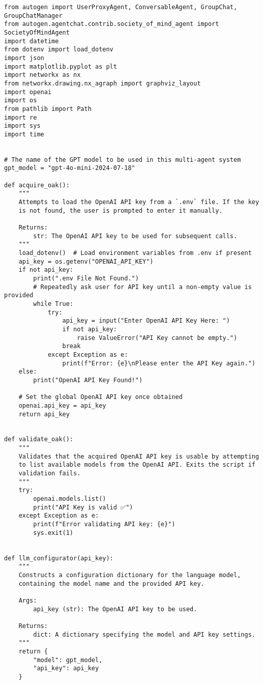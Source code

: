 \begin{lstlisting}
from autogen import UserProxyAgent, ConversableAgent, GroupChat, GroupChatManager
from autogen.agentchat.contrib.society_of_mind_agent import SocietyOfMindAgent
import datetime
from dotenv import load_dotenv
import json
import matplotlib.pyplot as plt
import networkx as nx
from networkx.drawing.nx_agraph import graphviz_layout
import openai
import os
from pathlib import Path
import re
import sys
import time


# The name of the GPT model to be used in this multi-agent system
gpt_model = "gpt-4o-mini-2024-07-18"

def acquire_oak():
    """
    Attempts to load the OpenAI API key from a `.env` file. If the key
    is not found, the user is prompted to enter it manually.

    Returns:
        str: The OpenAI API key to be used for subsequent calls.
    """
    load_dotenv()  # Load environment variables from .env if present
    api_key = os.getenv("OPENAI_API_KEY")
    if not api_key:
        print(".env File Not Found.")
        # Repeatedly ask user for API key until a non-empty value is provided
        while True:
            try:
                api_key = input("Enter OpenAI API Key Here: ")
                if not api_key:
                    raise ValueError("API Key cannot be empty.")
                break
            except Exception as e:
                print(f"Error: {e}\nPlease enter the API Key again.")
    else:
        print("OpenAI API Key Found!")

    # Set the global OpenAI API key once obtained
    openai.api_key = api_key
    return api_key


def validate_oak():
    """
    Validates that the acquired OpenAI API key is usable by attempting
    to list available models from the OpenAI API. Exits the script if
    validation fails.
    """
    try:
        openai.models.list()
        print("API Key is valid ✅")
    except Exception as e:
        print(f"Error validating API key: {e}")
        sys.exit(1)


def llm_configurator(api_key):
    """
    Constructs a configuration dictionary for the language model,
    containing the model name and the provided API key.

    Args:
        api_key (str): The OpenAI API key to be used.

    Returns:
        dict: A dictionary specifying the model and API key settings.
    """
    return {
        "model": gpt_model,
        "api_key": api_key
    }



\end{lstlisting}
